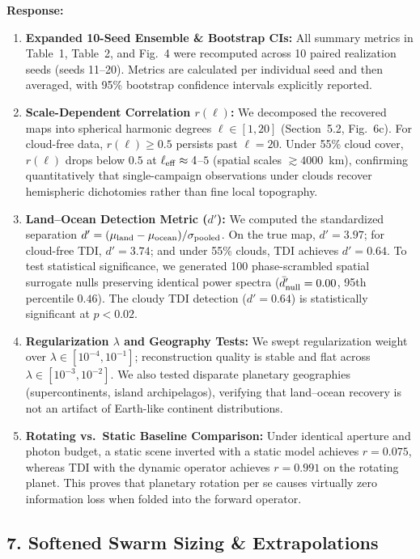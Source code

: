 \documentclass[11pt]{article}
\begin{document}
\textbf{Response:}\\[1mm]
\begin{enumerate}
\item \textbf{Expanded 10-Seed Ensemble \& Bootstrap CIs:} All summary metrics in Table~1, Table~2, and Fig.~4 were recomputed across 10 paired realization seeds (seeds 11--20). Metrics are calculated per individual seed and then averaged, with 95\% bootstrap confidence intervals explicitly reported.
\item \textbf{Scale-Dependent Correlation $r(\ell)$:} We decomposed the recovered maps into spherical harmonic degrees $\ell \in [1, 20]$ (Section~5.2, Fig.~6c). For cloud-free data, $r(\ell) \ge 0.5$ persists past $\ell = 20$. Under 55\% cloud cover, $r(\ell)$ drops below $0.5$ at $\ell_{\rm eff} \approx 4$--$5$ (spatial scales $\gtrsim 4000$~km), confirming quantitatively that single-campaign observations under clouds recover hemispheric dichotomies rather than fine local topography.
\item \textbf{Land--Ocean Detection Metric ($d'$):} We computed the standardized separation $d' = (\mu_{\rm land} - \mu_{\rm ocean}) / \sigma_{\rm pooled}$. On the true map, $d'=3.97$; for cloud-free TDI, $d'=3.74$; and under 55\% clouds, TDI achieves $d'=0.64$. To test statistical significance, we generated 100 phase-scrambled spatial surrogate nulls preserving identical power spectra ($\bar{d}'_{\rm null} = 0.00$, 95th percentile $0.46$). The cloudy TDI detection ($d'=0.64$) is statistically significant at $p < 0.02$.
\item \textbf{Regularization $\lambda$ and Geography Tests:} We swept regularization weight over $\lambda \in [10^{-4}, 10^{-1}]$; reconstruction quality is stable and flat across $\lambda \in [10^{-3}, 10^{-2}]$. We also tested disparate planetary geographies (supercontinents, island archipelagos), verifying that land--ocean recovery is not an artifact of Earth-like continent distributions.
\item \textbf{Rotating vs.\ Static Baseline Comparison:} Under identical aperture and photon budget, a static scene inverted with a static model achieves $r=0.075$, whereas TDI with the dynamic operator achieves $r=0.991$ on the rotating planet. This proves that planetary rotation per se causes virtually zero information loss when folded into the forward operator.
\end{enumerate}

\subsection*{7. Softened Swarm Sizing \& Extrapolations}
\end{document}
